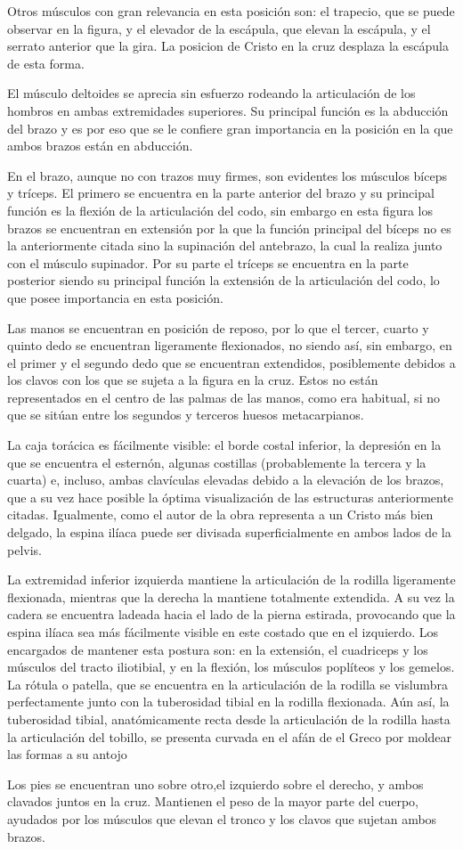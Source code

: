 Otros músculos con gran relevancia en esta posición son: el trapecio, que se puede observar en la figura, y el elevador de la escápula, que elevan la escápula, y el serrato anterior que la gira. La posicion de Cristo en la cruz desplaza la escápula de esta forma.

El músculo deltoides se aprecia sin esfuerzo rodeando la articulación de los hombros en ambas extremidades superiores. Su principal función es la abducción del brazo y es por eso que se le confiere gran importancia en la posición en la que ambos brazos están en abducción.

En el brazo, aunque no con trazos muy firmes, son evidentes los músculos bíceps y tríceps. El primero se encuentra en la parte anterior del brazo y su principal función es la flexión de la articulación del codo, sin embargo en esta figura los brazos se encuentran en extensión por la que la función principal del bíceps no es la anteriormente citada sino la supinación del antebrazo, la cual la realiza junto con el músculo supinador. Por su parte el tríceps se encuentra en la parte posterior siendo su principal función la extensión de la articulación del codo, lo que posee importancia en esta posición. 

Las manos se encuentran en posición de reposo, por lo que el tercer, cuarto y quinto dedo se encuentran ligeramente flexionados, no siendo así, sin embargo, en el primer y el segundo dedo que se encuentran extendidos, posiblemente debidos a los clavos con los que se sujeta a la figura en la cruz. Estos no están representados en el centro de las palmas de las manos, como era habitual, si no que se sitúan entre los segundos y terceros huesos metacarpianos.

La caja torácica es fácilmente visible: el borde costal inferior, la depresión en la que se encuentra el esternón, algunas costillas (probablemente la tercera y la cuarta) e, incluso, ambas clavículas elevadas debido a la elevación de los brazos, que a su vez hace posible la óptima visualización de las estructuras anteriormente citadas. Igualmente, como el autor de la obra representa a un Cristo más bien delgado, la espina ilíaca puede ser divisada superficialmente en ambos lados de la pelvis.

La extremidad inferior izquierda mantiene la articulación de la rodilla ligeramente flexionada, mientras que la derecha la mantiene totalmente extendida. A su vez la cadera se encuentra ladeada hacia el lado de la pierna estirada, provocando que la espina ilíaca sea más fácilmente visible en este costado que en el izquierdo.
Los encargados de mantener esta postura son: en la extensión, el cuadriceps y los músculos del tracto iliotibial, y en la flexión, los músculos poplíteos y los gemelos. La rótula o patella, que se encuentra en la articulación de la rodilla se vislumbra perfectamente junto con la tuberosidad tibial en la rodilla flexionada. Aún así, la tuberosidad tibial, anatómicamente recta desde la articulación de la rodilla hasta la articulación del tobillo, se presenta curvada en el afán de el Greco por moldear las formas a su antojo

Los pies se encuentran uno sobre otro,el izquierdo sobre el derecho, y ambos clavados juntos en la cruz. Mantienen el peso de la mayor parte del cuerpo, ayudados por los músculos que elevan el tronco y los clavos que sujetan ambos brazos.